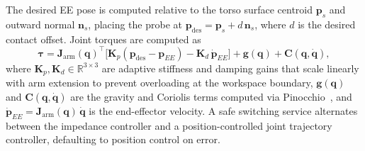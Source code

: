The desired \ac{EE} pose is computed relative to the torso surface centroid
$\mathbf{p}_s$ and outward normal $\mathbf{n}_s$, placing the probe at
$\mathbf{p}_{\mathrm{des}} = \mathbf{p}_s + d\,\mathbf{n}_s$, where $d$ is the
desired contact offset.  Joint torques are computed as
\begin{equation}
\boldsymbol{\tau} = \mathbf{J}_{\mathrm{arm}}(\mathbf{q})^\top
\bigl[\mathbf{K}_p(\mathbf{p}_{\mathrm{des}} - \mathbf{p}_{EE})
- \mathbf{K}_d\,\dot{\mathbf{p}}_{EE}\bigr]
+ \mathbf{g}(\mathbf{q}) + \mathbf{C}(\mathbf{q}, \dot{\mathbf{q}}),
\label{eq:impedance}
\end{equation}
where $\mathbf{K}_p, \mathbf{K}_d \in \mathbb{R}^{3 \times 3}$ are adaptive
stiffness and damping gains that scale linearly with arm extension to prevent
overloading at the workspace boundary, $\mathbf{g}(\mathbf{q})$ and
$\mathbf{C}(\mathbf{q}, \dot{\mathbf{q}})$ are the gravity and Coriolis terms
computed via Pinocchio~\cite{carpentier2019pinocchio}, and
$\dot{\mathbf{p}}_{EE} = \mathbf{J}_{\mathrm{arm}}(\mathbf{q})\,
\dot{\mathbf{q}}$ is the end-effector velocity.  A safe switching service
alternates between the impedance controller and a position-controlled joint
trajectory controller, defaulting to position control on error.
